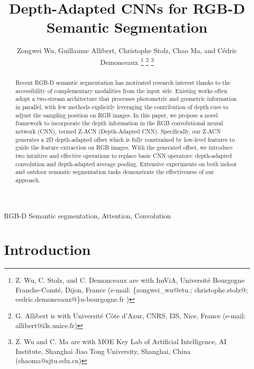 \documentclass[lettersize,journal]{IEEEtran}
\begin{document}
\title{Depth-Adapted CNNs for RGB-D Semantic Segmentation}

\author{Zongwei Wu, Guillaume Allibert, Christophe Stolz, Chao Ma, and C\'edric Demonceaux 
\thanks{Z. Wu, C. Stolz, and C. Demonceaux are with ImViA, Université Bourgogne Franche-Comté, Dijon, France (e-mail: \{zongwei\_wu@etu.; christophe.stolz@; cedric.demonceaux@\}u-bourgogne.fr )}
\thanks{G. Allibert is with Universit\'e  C\^ote d’Azur, CNRS, I3S, Nice, France (e-mail: allibert@i3s.unice.fr)}
\thanks{Z. Wu and C. Ma are with MOE Key Lab of Artificial Intelligence, AI Institute, Shanghai Jiao Tong University, Shanghai, China (chaoma@sjtu.edu.cn)}
}




\maketitle

\begin{abstract}
Recent RGB-D semantic segmentation has motivated research interest thanks to the accessibility of complementary modalities from the input side. Existing works often adopt a two-stream architecture that processes photometric and geometric information in parallel, with few methods explicitly leveraging the contribution of depth cues to adjust the sampling position on RGB images. In this paper, we propose a novel framework to incorporate the depth information in the RGB convolutional neural network (CNN), termed Z-ACN (Depth-Adapted CNN). Specifically, our Z-ACN generates a 2D depth-adapted offset which is fully constrained by low-level features to guide the feature extraction on RGB images. With the generated offset, we introduce two intuitive and effective operations to replace basic CNN operators: depth-adapted convolution and depth-adapted average pooling. Extensive experiments on both indoor and outdoor semantic segmentation tasks demonstrate the effectiveness of our approach.
\end{abstract}

\begin{IEEEkeywords}
RGB-D Semantic segmentation, Attention, Convolution
\end{IEEEkeywords}

\section{Introduction}
\end{document}
